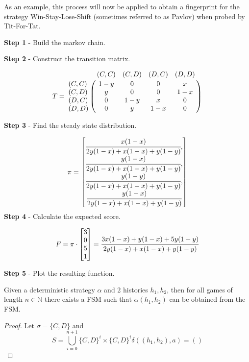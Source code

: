 As an example, this process will now be applied to obtain a fingerprint for the strategy Win-Stay-Lose-Shift (sometimes referred to as Pavlov) when probed by Tit-For-Tat.

\textbf{Step 1} - Build the markov chain.

\textbf{Step 2} - Construct the transition matrix.

\begin{equation}\label{eq:transition_matrix}
%
T = \bordermatrix{~      & (C, C) & (C, D) & (D, C) & (D, D) \cr
                  (C, C) & 1 - y  & 0      & 0      & x      \cr
                  (C, D) & y      & 0      & 0      & 1 - x  \cr
                  (D, C) & 0      & 1 - y  & x      & 0      \cr
                  (D, D) & 0      & y      & 1 - x  & 0}
%
\end{equation}

\textbf{Step 3} - Find the steady state distribution.

\begin{equation}\label{eq:steady_state}
%
\pi =
\begin{bmatrix}
\cfrac{x (1 - x)}{2y(1-x) + x(1-x) + y(1-y)}, \\
\cfrac{y (1 - x)}{2y(1-x) + x(1-x) + y(1-y)}, \\
\cfrac{y (1 - y)}{2y(1-x) + x(1-x) + y(1-y)}, \\
\cfrac{y (1 - x)}{2y(1-x) + x(1-x) + y(1-y)}
\end{bmatrix}
\end{equation}
\textbf{Step 4} - Calculate the expected score.

\begin{equation}
F = \pi \cdot
\begin{bmatrix}
3 \\
0 \\
5 \\
1
\end{bmatrix}
=
\cfrac{3x(1-x) + y(1-x) + 5y(1-y)}{2y(1-x) + x(1-x) + y(1-y)}
\end{equation}

\textbf{Step 5} - Plot the resulting function. %






\begin{theorem}\label{thm:fsm}
Given a deterministic strategy $\alpha$ and 2 histories $h_1, h_2$, then for all games of length $n \in \mathbb{N}$ there exists a FSM such that $\alpha(h_1, h_2)$ can be obtained from the FSM.
\end{theorem}

\begin{proof}\label{prf:fsm}
Let $\sigma = \{C, D\}$ and
\[
S = \bigcup_{i=0}^{n+1} \{C, D\}^i \times \{C, D\}^i
\delta((h_1, h_2), a) =()
\]

\end{proof}
